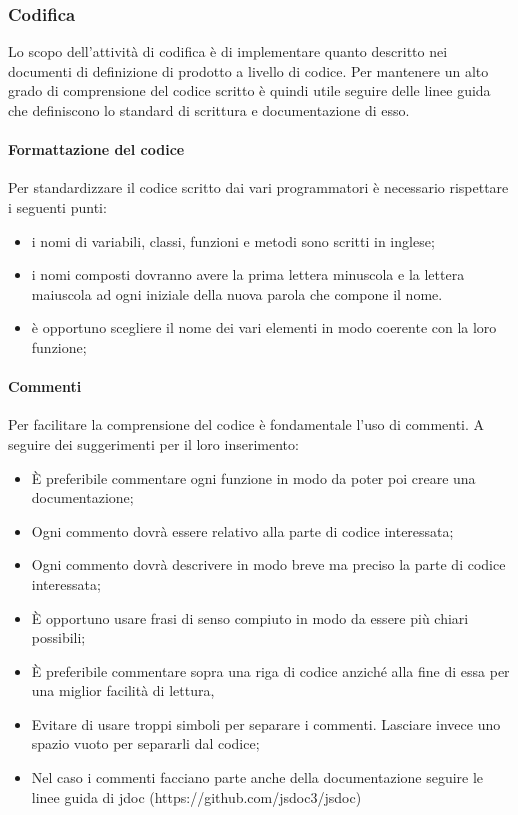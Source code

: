 	\subsubsection{Codifica}%
	Lo scopo dell'attività di codifica è di implementare quanto descritto nei documenti di definizione di prodotto a livello di codice. Per mantenere un alto grado di comprensione del codice scritto è quindi utile seguire delle linee guida che definiscono lo standard di scrittura e documentazione di esso.
		\paragraph{Formattazione del codice}
		Per standardizzare il codice scritto dai vari programmatori è necessario rispettare i seguenti punti:
			\begin{itemize}
				\item i nomi di variabili, classi, funzioni e metodi sono scritti in inglese;
				\item i nomi composti dovranno avere la prima lettera minuscola e la lettera maiuscola ad ogni iniziale della nuova parola che compone il nome.
				\item è opportuno scegliere il nome dei vari elementi in modo coerente con la loro funzione;
				
			\end{itemize}
		\paragraph{Commenti}
		Per facilitare la comprensione del codice è fondamentale l'uso di commenti. A seguire dei suggerimenti per il loro inserimento:
		\begin{itemize}
			\item È preferibile commentare ogni funzione in modo da poter poi creare una documentazione;
			\item Ogni commento dovrà essere relativo alla parte di codice interessata;
			\item Ogni commento dovrà descrivere in modo breve ma preciso la parte di codice interessata;
			\item È opportuno usare frasi di senso compiuto in modo da essere più chiari possibili;
			\item È preferibile commentare sopra una riga di codice anziché alla fine di essa per una miglior facilità di lettura,
			\item Evitare di usare troppi simboli per separare i commenti. Lasciare invece uno spazio vuoto per separarli dal codice;
			\item Nel caso i commenti facciano parte anche della documentazione seguire le linee guida di jdoc (https://github.com/jsdoc3/jsdoc) %
		\end{itemize}
